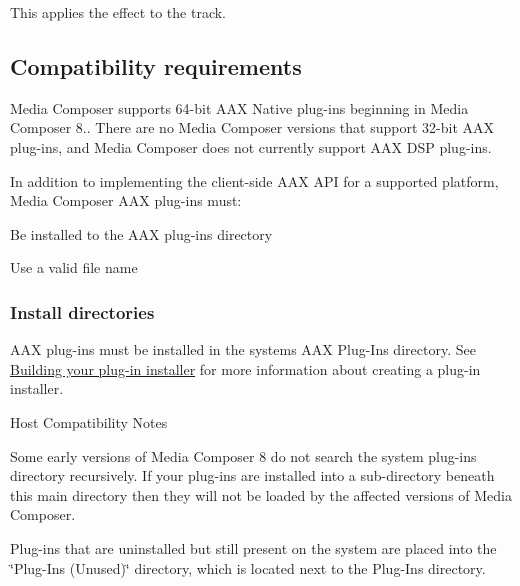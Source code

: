 This applies the effect to the track.



 \hypertarget{a00361_aax_media_composer_guide__requirements}{}\subsection{Compatibility requirements}\label{a00361_aax_media_composer_guide__requirements}
 Media Composer supports 64-\/bit A\+A\+X Native plug-\/ins beginning in Media Composer 8.. There are no Media Composer versions that support 32-\/bit A\+A\+X plug-\/ins, and Media Composer does not currently support A\+A\+X D\+S\+P plug-\/ins.

In addition to implementing the client-\/side A\+A\+X A\+P\+I for a supported platform, Media Composer A\+A\+X plug-\/ins must\+: 
\begin{DoxyEnumerate}
\item Be installed to the A\+A\+X plug-\/ins directory  
\item Use a valid file name 
\end{DoxyEnumerate}

\hypertarget{a00361_subsection__media_composer_guide__install_directories}{}\subsubsection{Install directories}\label{a00361_subsection__media_composer_guide__install_directories}
 A\+A\+X plug-\/ins must be installed in the system\textquotesingle{}s A\+A\+X Plug-\/\+Ins directory. See \hyperlink{a00372_aax_distributing_installer}{Building your plug-\/in installer} for more information about creating a plug-\/in installer.

\begin{DoxyRefDesc}{Host Compatibility Notes}
\item[\hyperlink{a00380__compatibility_notes000006}{Host Compatibility Notes}]Some early versions of Media Composer 8 do not search the system plug-\/ins directory recursively. If your plug-\/ins are installed into a sub-\/directory beneath this main directory then they will not be loaded by the affected versions of Media Composer.\end{DoxyRefDesc}


Plug-\/ins that are uninstalled but still present on the system are placed into the \char`\"{}\+Plug-\/\+Ins (\+Unused)\char`\"{} directory, which is located next to the Plug-\/\+Ins directory.


